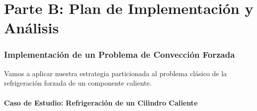 \part*{Parte B: Plan de Implementación y Análisis}

\section{Implementación de un Problema de Convección Forzada}
Vamos a aplicar nuestra estrategia particionada al problema clásico de la refrigeración forzada de un componente caliente.

\subsection{Caso de Estudio: Refrigeración de un Cilindro Caliente}
